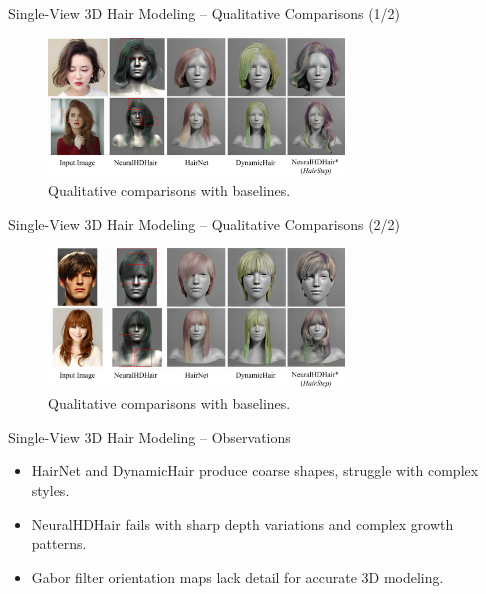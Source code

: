 \begin{frame}{Single-View 3D Hair Modeling -- Qualitative Comparisons (1/2)}
    \begin{figure}
        \centering
        \includegraphics[width=0.7\textwidth]{assets/figures/eval/existing-methods-vis-comparison-1.png}
        \caption{Qualitative comparisons with baselines.}
    \end{figure}
\end{frame}

\begin{frame}{Single-View 3D Hair Modeling -- Qualitative Comparisons (2/2)}
    \begin{figure}
        \centering
        \includegraphics[width=0.7\textwidth]{assets/figures/eval/existing-methods-vis-comparison-2.png}
        \caption{Qualitative comparisons with baselines.}
    \end{figure}
\end{frame}

\begin{frame}[t]{Single-View 3D Hair Modeling -- Observations}
    \begin{itemize}
        \item HairNet and DynamicHair produce coarse shapes, struggle with complex styles.
        \item NeuralHDHair fails with sharp depth variations and complex growth patterns.
        \item Gabor filter orientation maps lack detail for accurate 3D modeling.
    \end{itemize}
\end{frame}

